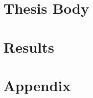 \documentclass[
	fontsize=10pt,
	twoside=false,
	numbers=noenddot,
]{kaobook}
\begin{document}
\mainmatter
{}

\part{Thesis Body}



\part{Results}



\printbibliography

\appendix
\part{Appendix}



\cleardoublepage

\end{document}
